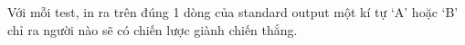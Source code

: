 Với mỗi test, in ra trên đúng 1 dòng của standard output một kí tự ‘A’ hoặc ‘B’ chỉ ra người nào sẽ có chiến lược giành chiến thắng.